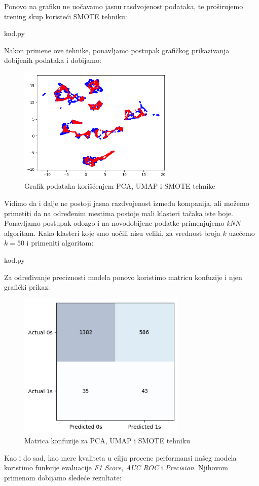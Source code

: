 \documentclass[12pt]{article}
\theoremstyle{definition}
\theoremstyle{remark}
\begin{document}
Ponovo na grafiku ne uočavamo jasnu rasdvojenost podataka, te proširujemo trening skup koristeći SMOTE tehniku:

\hfill

{kod.py}

\hfill
\newpage
Nakon primene ove tehnike, ponavljamo postupak grafičkog prikazivanja dobijenih podataka i dobijamo:

\begin{figure}[htp]
    \centering
    \includegraphics[width=7.5cm]{output_61_0.png}
    \caption{Grafik podataka korišćenjem PCA, UMAP i SMOTE tehnike}
    \label{fig:galaxy}
\end{figure}

Vidimo da i dalje ne postoji jasna razdvojenost između kompanija, ali možemo primetiti da na određenim mestima postoje mali klasteri tačaka iste boje. Ponavljamo postupak odozgo i na novodobijene podatke primenjujemo \emph{kNN} algoritam. Kako klasteri koje smo uočili nisu veliki, za vrednost broja $k$ uzećemo $k=50$ i primeniti algoritam:

\hfill

{kod.py}

\hfill

Za određivanje preciznosti modela ponovo koristimo matricu konfuzije i njen grafički prikaz:

\begin{figure}[htp]
    \centering
    \includegraphics[width=8cm]{output_62_0.png}
    \caption{Matrica konfuzije za PCA, UMAP i SMOTE tehniku}
    \label{fig:galaxy}
\end{figure}
\newpage
Kao i do sad, kao mere kvaliteta u cilju procene performansi našeg modela koristimo funkcije evaluacije  \emph{F1 Score}, \emph{AUC ROC} i \emph{Precision}. Njihovom primenom dobijamo sledeće rezultate:
\end{document}
